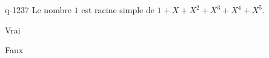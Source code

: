 \begin{truefalse}{q-1237}
Le nombre $1$ est racine simple de $1+X+X^2+X^3+X^4+X^5$.
\item* Vrai
\item Faux
\end{truefalse}

